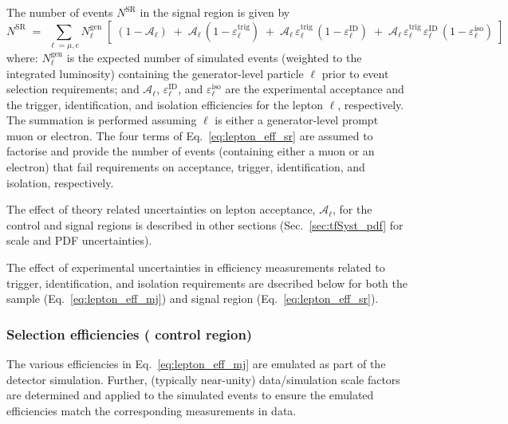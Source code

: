 The number of events $N^\textrm{SR}$ in the signal region is given by
\begin{equation}
  \label{eq:lepton_eff_sr}
  N^\textrm{SR} 
  \; = \; 
  \sum_{\ell = \mu,e} 
  N^\textrm{gen}_\ell 
  \; [ \;
  (1-\mathcal{A}_\ell)
  \; + \;
  \mathcal{A}_\ell \,
  (1-\varepsilon^\textrm{trig}_\ell)
  \; + \;
  \mathcal{A}_\ell \,
  \varepsilon^\textrm{trig}_\ell \,
  (1-\varepsilon^\textrm{ID}_\ell)
  \; + \;
  \mathcal{A}_\ell \,
  \varepsilon^\textrm{trig}_\ell \,
  \varepsilon^\textrm{ID}_\ell \,
  (1-\varepsilon^\textrm{iso}_\ell)
  \; ]
\end{equation}
where: $N^\textrm{gen}_\ell$ is the expected number of simulated
events (weighted to the integrated luminosity) containing the
generator-level particle $\ell$ prior to event selection requirements;
and $\mathcal{A}_\ell$, $\varepsilon^\textrm{ID}_\ell$, and
$\varepsilon^\textrm{iso}_\ell$ are the experimental acceptance and
the trigger, identification, and isolation efficiencies for the lepton
$\ell$, respectively. The summation is performed assuming $\ell$ is
either a generator-level prompt muon or electron. The four terms of
Eq.~\ref{eq:lepton_eff_sr} are assumed to factorise and provide
the number of events (containing either a muon or an electron) that
fail requirements on acceptance, trigger, identification, and
isolation, respectively.

The effect of theory related uncertainties on lepton acceptance,
$\mathcal{A}_\ell$, for the \mj control and signal regions is
described in other sections (\eg Sec.~\ref{sec:tfSyst_pdf} for scale
and PDF uncertainties).

The effect of experimental uncertainties in efficiency measurements
related to trigger, identification, and isolation requirements are
dsecribed below for both the \mj sample (Eq.~\ref{eq:lepton_eff_mj})
and signal region (Eq.~\ref{eq:lepton_eff_sr}).

\subsubsection*{Selection efficiencies (\texorpdfstring{\mj}{mu+jets} control region)}

The various efficiencies in Eq.~\ref{eq:lepton_eff_mj} are emulated as
part of the detector simulation. Further, (typically near-unity)
data/simulation scale factors are determined and applied to the
simulated events to ensure the emulated efficiencies match the
corresponding measurements in data.

